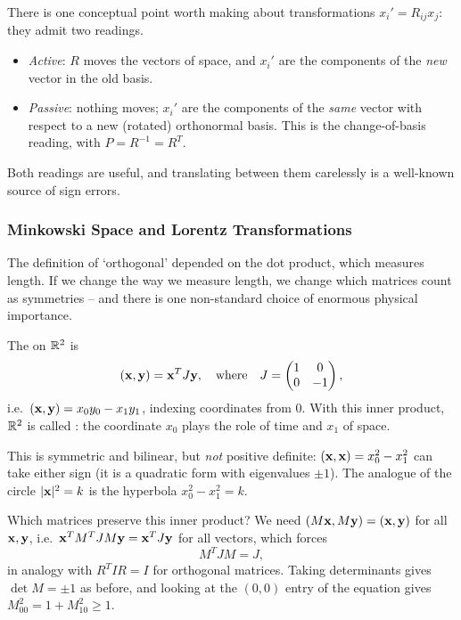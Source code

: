 \documentclass[a4paper]{scrartcl}
\begin{document}
There is one conceptual point worth making about transformations $x_i' = R_{ij}x_j$: they admit two readings.
\begin{itemize}
	\item \emph{Active}: $R$ moves the vectors of space, and $x_i'$ are the components of the \emph{new} vector in the old basis.
	\item \emph{Passive}: nothing moves; $x_i'$ are the components of the \emph{same} vector with respect to a new (rotated) orthonormal basis. This is the change-of-basis reading, with $P = R^{-1} = R^T$.
\end{itemize}
Both readings are useful, and translating between them carelessly is a well-known source of sign errors.

\subsubsection{Minkowski Space and Lorentz Transformations}

The definition of `orthogonal' depended on the dot product, which measures length. If we change the way we measure length, we change which matrices count as symmetries -- and there is one non-standard choice of enormous physical importance.

\begin{definition}
	The  on $\mathbb{R}^2$ is
	$$
	(\mathbf{x}, \mathbf{y}) = \mathbf{x}^T J \mathbf{y}, \quad \text{where} \quad J = \begin{pmatrix}
		1 & 0 \\ 0 & -1
	\end{pmatrix},
	$$
	i.e.\ $(\mathbf{x}, \mathbf{y}) = x_0 y_0 - x_1 y_1$, indexing coordinates from $0$. With this inner product, $\mathbb{R}^2$ is called : the coordinate $x_0$ plays the role of time and $x_1$ of space.
\end{definition}

This is symmetric and bilinear, but \emph{not} positive definite: $(\mathbf{x}, \mathbf{x}) = x_0^2 - x_1^2$ can take either sign (it is a quadratic form with eigenvalues $\pm 1$). The analogue of the circle $|\mathbf{x}|^2 = k$ is the hyperbola $x_0^2 - x_1^2 = k$.

Which matrices preserve this inner product? We need $(M\mathbf{x}, M\mathbf{y}) = (\mathbf{x}, \mathbf{y})$ for all $\mathbf{x}, \mathbf{y}$, i.e.\ $\mathbf{x}^T M^TJM\mathbf{y} = \mathbf{x}^TJ\mathbf{y}$ for all vectors, which forces
$$
M^TJM = J,
$$
in analogy with $R^TIR = I$ for orthogonal matrices. Taking determinants gives $\det M = \pm 1$ as before, and looking at the $(0,0)$ entry of the equation gives $M_{00}^2 = 1 + M_{10}^2 \geq 1$.
\end{document}
